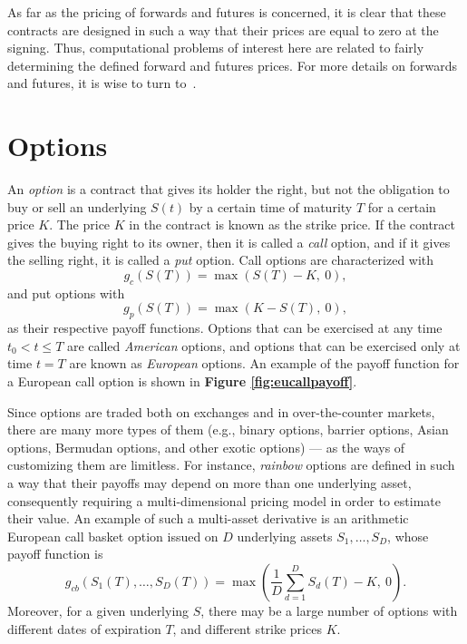 \documentclass{UUThesisTemplate}
\begin{document}
\par
As far as the pricing of forwards and futures is concerned, it is clear that these contracts are designed in such a way that their prices are equal to zero at the signing. Thus, computational problems of interest here are related to fairly determining the defined forward and futures prices. For more details on forwards and futures, it is wise to turn to~\cite{duffie1989futures,hull2017options}.  
%





%
\section{Options}
\label{sec:options}

\par
An \emph{option} is a contract that gives its holder the right, but not the obligation to buy or sell an underlying $S(t)$ by a certain time of maturity $T$ for a certain price $K$. The price $K$ in the contract is known as the strike price. If the contract gives the buying right to its owner, then it is called a \emph{call} option, and if it gives the selling right, it is called a \emph{put} option. Call options are characterized with 
\begin{equation}
\label{eq:callop}
g_c(S(T))=\max(S(T)-K,\ 0),
\end{equation}
and put options with 
\begin{equation}
\label{eq:putop}
g_p(S(T))=\max(K-S(T),\ 0),
\end{equation}
as their respective payoff functions. Options that can be exercised at any time $t_0 < t \leq T$ are called \emph{American} options, and options that can be exercised only at time $t=T$ are known as \emph{European} options. An example of the payoff function for a European call option is shown in \textbf{Figure \ref{fig:eucallpayoff}}. 

\par
Since options are traded both on exchanges and in over-the-counter markets, there are many more types of them (e.g., binary options, barrier options, Asian options, Bermudan options, and other exotic options) --- as the ways of customizing them are limitless. For instance, \emph{rainbow} options are defined in such a way that their payoffs may depend on more than one underlying asset, consequently requiring a multi-dimensional pricing model in order to estimate their value. An example of such a multi-asset derivative is an arithmetic European call basket option issued on $D$ underlying assets $S_1,\ldots,S_D$, whose payoff function is 
\begin{equation}
\label{eq:basketop}
g_{cb}(S_1(T),\ldots,S_D(T)) = \max\left(\frac{1}{D}\sum_{d=1}^D S_d(T) - K,\ 0\right).
\end{equation}
Moreover, for a given underlying $S$, there may be a large number of options with different dates of expiration $T$, and different strike prices $K$.
\end{document}
